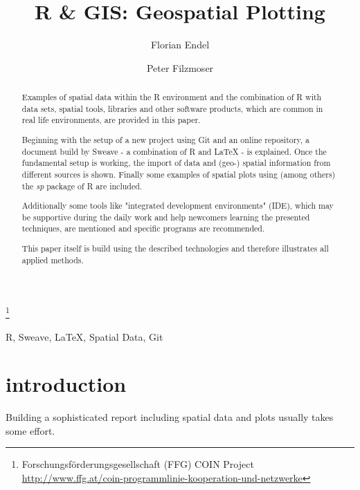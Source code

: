 \documentclass{ifacconf}
\begin{document}
\begin{frontmatter}

\title{R \& GIS: Geospatial Plotting} 

\thanks[footnoteinfo]{Forschungsförderungsgesellschaft (FFG) COIN Project
\url{http://www.ffg.at/coin-programmlinie-kooperation-und-netzwerke}}

\author[First]{Florian Endel} 
\author[Second]{Peter Filzmoser} 

\address[First]{FFG IFEDH project, Student at Vienna University of Technology (e-mail: florian@endel.at).}
\address[Second]{Department of Statistics and Probability Theory,
Vienna University of Technology (e-mail: P.Filzmoser@tuwien.ac.at)}

\begin{abstract}                %
Examples of spatial data within the R environment and the 
combination of R with data sets, spatial
tools, libraries and other software products, which are common 
in real life environments, are provided in this paper.

Beginning with the setup of a new project using Git 
and an online repository, a document build by Sweave - a
combination of R and \LaTeX{} - is explained. Once the 
fundamental setup is working, the import
of data and (geo-) spatial information from different 
sources is shown. Finally some examples of spatial plots
using (among others) the \textit{sp} package of R are included.

Additionally some tools like "integrated development environments" (IDE), 
which may be supportive during the daily work
and help newcomers learning the presented techniques, 
are mentioned and specific programs are recommended.

This paper itself is build using the described technologies and therefore illustrates 
all applied methods. 
\end{abstract}

\begin{keyword}
R, Sweave, \LaTeX{}, Spatial Data, Git
\end{keyword}

\end{frontmatter}

\section{introduction}
Building a sophisticated report including spatial data and plots 
usually takes some effort.
\end{document}
